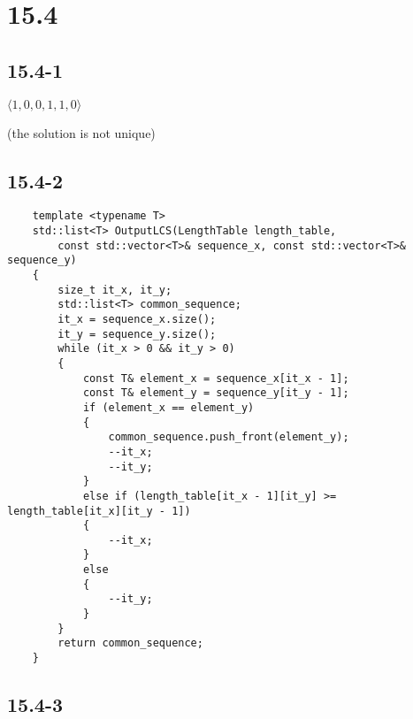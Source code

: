 \section*{15.4}

\subsection*{15.4-1}

$\langle 1, 0, 0, 1, 1, 0 \rangle$

(the solution is not unique)

\subsection*{15.4-2}

\begin{verbatim}
    template <typename T>
    std::list<T> OutputLCS(LengthTable length_table, 
        const std::vector<T>& sequence_x, const std::vector<T>& sequence_y)
    {
        size_t it_x, it_y;
        std::list<T> common_sequence;
        it_x = sequence_x.size();
        it_y = sequence_y.size();
        while (it_x > 0 && it_y > 0)
        {
            const T& element_x = sequence_x[it_x - 1];
            const T& element_y = sequence_y[it_y - 1];
            if (element_x == element_y)
            {
                common_sequence.push_front(element_y);
                --it_x;
                --it_y;
            }
            else if (length_table[it_x - 1][it_y] >= length_table[it_x][it_y - 1])
            {
                --it_x;
            }
            else
            {
                --it_y;
            }
        }
        return common_sequence;
    }
\end{verbatim}

\subsection*{15.4-3}

